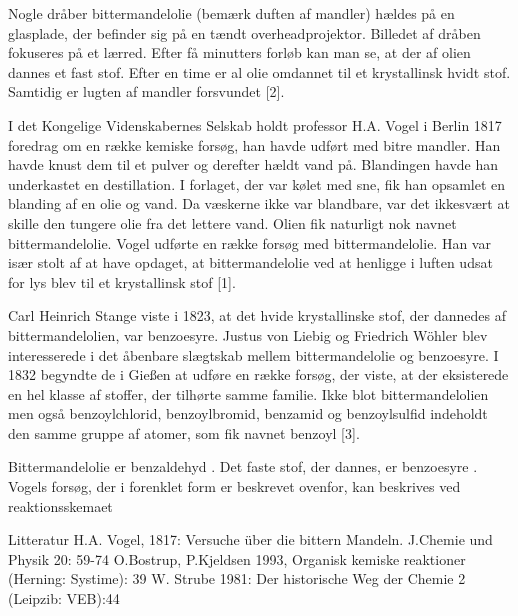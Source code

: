 

Nogle dråber bittermandelolie (bemærk duften af mandler) hældes på en glasplade, der befinder sig på en tændt overheadprojektor. Billedet af dråben fokuseres på et lærred.
Efter få minutters forløb kan man se, at der af olien dannes et fast stof. Efter en time er al olie omdannet til et krystallinsk hvidt stof. Samtidig er lugten af mandler forsvundet [2].


I det Kongelige Videnskabernes Selskab holdt professor H.A. Vogel i Berlin 1817 foredrag om en række kemiske forsøg, han havde udført med bitre mandler. Han havde knust dem til et pulver og derefter hældt vand på.
Blandingen havde han underkastet en destillation. I forlaget, der var kølet med sne, fik han opsamlet en blanding af en olie og vand. Da væskerne ikke var blandbare, var det ikkesvært at skille den tungere olie fra det lettere vand. Olien fik naturligt nok navnet bittermandelolie.
Vogel udførte en række forsøg med bittermandelolie. Han var især stolt af at have opdaget, at bittermandelolie ved at henligge i luften udsat for lys blev til et krystallinsk stof [1].

Carl Heinrich Stange viste i 1823, at det hvide krystallinske stof, der dannedes af bittermandelolien, var benzoesyre.
Justus von Liebig og Friedrich Wöhler blev interesserede i det åbenbare slægtskab mellem bittermandelolie og benzoesyre. I 1832 begyndte de i Gießen at udføre en række forsøg, der viste, at der eksisterede en hel klasse af stoffer, der tilhørte samme familie.
Ikke blot bittermandelolien men også benzoylchlorid, benzoylbromid, benzamid og benzoylsulfid indeholdt den samme gruppe af atomer, som fik navnet benzoyl [3].

Bittermandelolie er benzaldehyd . Det faste stof, der dannes, er benzoesyre . Vogels forsøg, der i forenklet form er beskrevet ovenfor, kan beskrives ved reaktionsskemaet



Litteratur
H.A. Vogel, 1817: Versuche über die bittern Mandeln. J.Chemie und Physik 20: 59-74
O.Bostrup, P.Kjeldsen 1993, Organisk kemiske reaktioner (Herning: Systime): 39
W. Strube 1981: Der historische Weg der Chemie 2 (Leipzib: VEB):44
